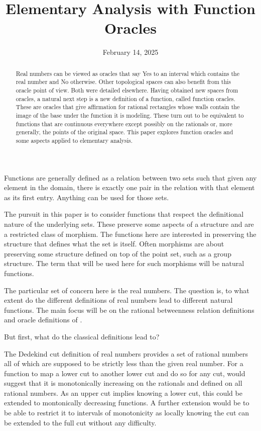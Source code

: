 \documentclass[12pt]{article}
\title{Elementary Analysis with Function Oracles}
\date{February 14, 2025}
\begin{document}
\maketitle
\begin{abstract}
Real numbers can be viewed as oracles that say Yes to an interval which contains the real number and No otherwise. Other topological spaces can also benefit from this oracle point of view.  Both were detailed elsewhere. Having obtained new spaces from oracles, a natural next step is a new definition of a function, called function oracles. These are oracles that give affirmation for rational rectangles whose walls contain the image of the base under the function it is modeling. These turn out to be equivalent to functions that are continuous everywhere except possibly on the rationals or, more generally, the points of the original space. This paper explores function oracles and some aspects applied to elementary analysis. 
\end{abstract}

\tableofcontents

Functions are generally defined as a relation between two sets such that given any element in the domain, there is exactly one pair in the relation with that element as its first entry. Anything can be used for those sets. 

The pursuit in this paper is to consider functions that respect the definitional nature of the underlying sets. These preserve some aspects of a structure and are a restricted class of morphism. The functions here are interested in preserving the structure that defines what the set is itself. Often morphisms are about preserving some structure defined on top of the point set, such as a group structure. The term that will be used here for such morphisms will be natural functions. 

The particular set of concern here is the real numbers. The question is, to what extent do the different definitions of real numbers lead to different natural functions. The main focus will be on the rational betweenness relation definitions and oracle definitions of \cite{taylor24oraclerbr}.

But first, what do the classical definitions lead to? 

The Dedekind cut definition of real numbers provides a set of rational numbers all of which are supposed to be strictly less than the given real number. For a function to map a lower cut to another lower cut and do so for any cut, would suggest that it is monotonically increasing on the rationals and defined on all rational numbers. As an upper cut implies knowing a lower cut, this could be extended to montonically decreasing functions. A further extension would be to be able to restrict it to intervals of monotonicity as locally knowing the cut can be extended to the full cut without any difficulty. 
\end{document}
